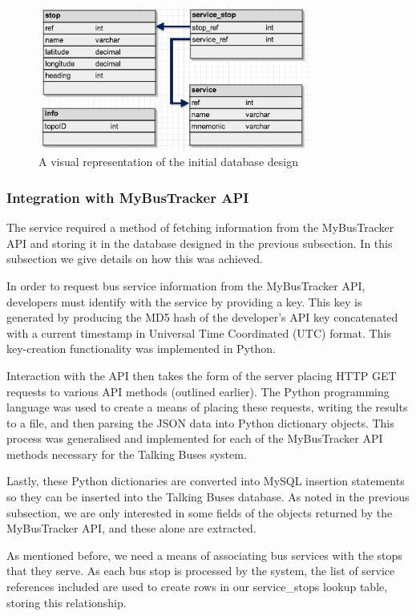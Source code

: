 \documentclass[10pt,twocolumn]{article}
\begin{document}
\begin{figure}[htbp]
  \centering
    \includegraphics[width=0.8\textwidth]{schema}
    \caption{A visual representation of the initial database design}
    \label{fig:schema}
\end{figure}

\subsubsection{Integration with MyBusTracker API}
\label{sec:serverIntegration}
The service required a method of fetching information from the MyBusTracker API and storing it in the database designed in the previous subsection. In this subsection we give details on how this was achieved.

In order to request bus service information from the MyBusTracker API, developers must identify with the service by providing a key. This key is generated by producing the MD5 hash of the developer's API key concatenated with a current timestamp in Universal Time Coordinated (UTC) format. This key-creation functionality was implemented in Python.

Interaction with the API then takes the form of the server placing HTTP GET requests to various API methods (outlined earlier). The Python programming language was used to create a means of placing these requests, writing the results to a file, and then parsing the JSON data into Python dictionary objects. This process was generalised and implemented for each of the MyBusTracker API methods necessary for the Talking Buses system.

Lastly, these Python dictionaries are converted into MySQL insertion statements so they can be inserted into the Talking Buses database. As noted in the previous subsection, we are only interested in some fields of the objects returned by the MyBusTracker API, and these alone are extracted.

As mentioned before, we need a means of associating bus services with the stops that they serve. As each bus stop is processed by the system, the list of service references included are used to create rows in our service\_stops lookup table, storing this relationship.
\end{document}
